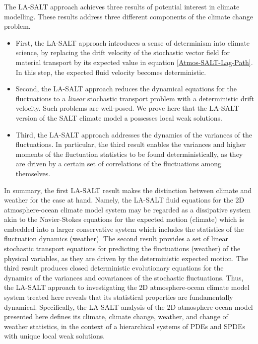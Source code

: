 \documentclass[11pt, oneside]{article}   	%
\numberwithin{equation}{section}
\theoremstyle{plain}
\theoremstyle{definition}
\theoremstyle{remark}
\newcommand{\<}{\langle}
\renewcommand{\>}{\rangle}
\begin{document}
The LA-SALT approach achieves three results of potential interest in climate modelling. These results address three different components of the climate change problem. 
\begin{itemize}
    \item First, the LA-SALT approach introduces a sense of determinism into climate science, by replacing the drift velocity of the stochastic vector field for material transport by its expected value in equation \eqref{Atmos-SALT-Lag-Path}. In this step, the expected fluid velocity becomes deterministic. 
    \item Second, the LA-SALT approach reduces the dynamical equations for the fluctuations to a \emph{linear} stochastic transport problem with a deterministic drift velocity. Such problems are well-posed. We prove here that the LA-SALT version of the SALT climate model a possesses local weak solutions. 
    \item Third, the LA-SALT approach addresses the dynamics of the variances of the fluctuations. In particular, the third result enables the variances and higher moments of the fluctuation statistics to be found deterministically, as they are driven by a certain set of correlations of the fluctuations among themselves. 
\end{itemize}
In summary, the first LA-SALT result makes the distinction between climate and weather for the case at hand. Namely, the LA-SALT fluid equations for the 2D atmosphere-ocean climate model system may be regarded as a dissipative system akin to the Navier-Stokes equations for the expected motion (climate) which is embedded into a larger conservative system which includes the statistics of the fluctuation dynamics (weather). The second result provides a set of linear stochastic transport equations for predicting the fluctuations (weather) of the physical variables, as they are driven by the deterministic expected motion. The third result produces closed deterministic evolutionary equations for the dynamics of the variances and covariances of the stochastic fluctuations.
Thus, the LA-SALT approach to investigating the 2D atmosphere-ocean climate model system treated here reveals that its statistical properties are fundamentally dynamical. 
Specifically, the LA-SALT analysis of the 2D atmosphere-ocean model presented here defines its climate, climate change, weather, and change of weather statistics, in the context of a hierarchical systems of PDEs and SPDEs with unique local weak solutions.
\color{black}
\end{document}
